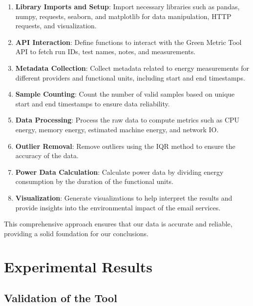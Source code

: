 \documentclass[sigconf,9pt,usenames,dvipsnames,table]{acmart}
\begin{document}
\begin{enumerate}
  \item \textbf{Library Imports and Setup}: Import necessary libraries such as pandas, numpy, requests, seaborn, and matplotlib for data manipulation, HTTP requests, and visualization.
  \item \textbf{API Interaction}: Define functions to interact with the Green Metric Tool API to fetch run IDs, test names, notes, and measurements.
  \item \textbf{Metadata Collection}: Collect metadata related to energy measurements for different providers and functional units, including start and end timestamps.
  \item \textbf{Sample Counting}: Count the number of valid samples based on unique start and end timestamps to ensure data reliability.
  \item \textbf{Data Processing}: Process the raw data to compute metrics such as CPU energy, memory energy, estimated machine energy, and network IO.
  \item \textbf{Outlier Removal}: Remove outliers using the IQR method to ensure the accuracy of the data.
  \item \textbf{Power Data Calculation}: Calculate power data by dividing energy consumption by the duration of the functional units.
  \item \textbf{Visualization}: Generate visualizations to help interpret the results and provide insights into the environmental impact of the email services.
\end{enumerate}

This comprehensive approach ensures that our data is accurate and reliable, providing a solid foundation for our conclusions.


\section{Experimental Results}

\subsection{Validation of the Tool}\label{sec:validation}
\end{document}
